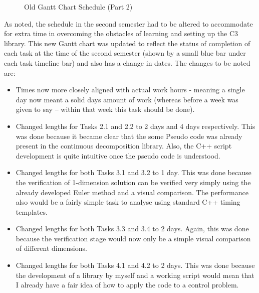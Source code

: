 \documentclass[11pt,draftd]{article}
\begin{document}
\begin{appendices}
\begin{figure}[h]
		\caption{Old Gantt Chart Schedule (Part 2)}
	\end{figure}
	\newpage
	As noted, the schedule in the second semester had to be altered to accommodate for extra time in overcoming the obstacles of learning and setting up the C3 library. This new Gantt chart was updated to reflect the status of completion of each task at the time of the second semester (shown by a small blue bar under each task timeline bar) and also has a change in dates. The changes to be noted are: \\
	\begin{itemize}
		\item Times now more closely aligned with actual work hours - meaning a single day now meant a solid days amount of work (whereas before a week was given to say -- within that week this task should be done).
		\item Changed lengths for Tasks 2.1 and 2.2 to 2 days and 4 days respectively. This was done because it became clear that the some Pseudo code was already present in the continuous decomposition library. Also, the C++ script development is quite intuitive once the pseudo code is understood.
		\item Changed lengths for both Tasks 3.1 and 3.2 to 1 day. This was done because the verification of 1-dimension solution can be verified very simply using the already developed Euler method and a visual comparison. The performance also would be a fairly simple task to analyse using standard C++ timing templates.
		\item Changed lengths for both Tasks 3.3 and 3.4 to 2 days. Again, this was done because the verification stage would now only be a simple visual comparison of different dimensions.
		\item Changed lengths for both Tasks 4.1 and 4.2 to 2 days. This was done because the development of a library by myself and a working script would mean that I already have a fair idea of how to apply the code to a control problem. \\
	\end{itemize}
	

\end{appendices}
\end{document}
